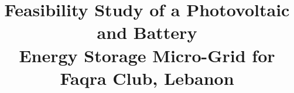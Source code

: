 \documentclass[conference]{IEEEtran}
\begin{document}
\title{Feasibility Study of a Photovoltaic and Battery\\Energy Storage Micro-Grid for Faqra Club, Lebanon}
\author{
\and {}}
\maketitle










\end{document}
